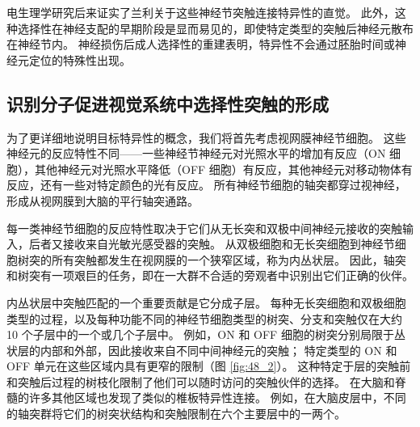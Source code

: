 电生理学研究后来证实了兰利关于这些神经节突触连接特异性的直觉。
此外，这种选择性在神经支配的早期阶段是显而易见的，即使特定类型的突触后神经元散布在神经节内。
神经损伤后成人选择性的重建表明，特异性不会通过胚胎时间或神经元定位的特殊性出现。



\subsection{识别分子促进视觉系统中选择性突触的形成}

为了更详细地说明目标特异性的概念，我们将首先考虑视网膜神经节细胞。
这些神经元的反应特性不同——一些神经节神经元对光照水平的增加有反应（ON 细胞），其他神经元对光照水平降低（OFF 细胞）有反应，其他神经元对移动物体有反应，还有一些对特定颜色的光有反应。
所有神经节细胞的轴突都穿过视神经，形成从视网膜到大脑的平行轴突通路。


每一类神经节细胞的反应特性取决于它们从无长突和双极中间神经元接收的突触输入，后者又接收来自光敏光感受器的突触。
从双极细胞和无长突细胞到神经节细胞树突的所有突触都发生在视网膜的一个狭窄区域，称为内丛状层。
因此，轴突和树突有一项艰巨的任务，即在一大群不合适的旁观者中识别出它们正确的伙伴。


内丛状层中突触匹配的一个重要贡献是它分成子层。
每种无长突细胞和双极细胞类型的过程，以及每种功能不同的神经节细胞类型的树突、分支和突触仅在大约 10 个子层中的一个或几个子层中。
例如，ON 和 OFF 细胞的树突分别局限于丛状层的内部和外部，因此接收来自不同中间神经元的突触；
特定类型的 ON 和 OFF 单元在这些区域内具有更窄的限制（图 \ref{fig:48_2}）。
这种特定于层的突触前和突触后过程的树枝化限制了他们可以随时访问的突触伙伴的选择。
在大脑和脊髓的许多其他区域也发现了类似的椎板特异性连接。
例如，在大脑皮层中，不同的轴突群将它们的树突状结构和突触限制在六个主要层中的一两个。



